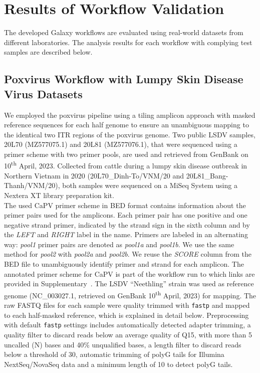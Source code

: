 \chapter{Results of Workflow Validation}\label{chap:results}
The developed Galaxy workflows are evaluated using real-world datasets from different laboratories. The analysis results for each workflow with complying test samples are described below.

\section{Poxvirus Workflow with Lumpy Skin Disease Virus Datasets}
We employed the poxvirus pipeline using a tiling amplicon approach with masked reference sequences for each half genome to ensure an unambiguous mapping to the identical two \ac{ITR} regions of the poxvirus genome. Two public \ac{LSDV} samples, 20L70 (MZ577075.1) and 20L81 (MZ577076.1), that were sequenced using a primer scheme with two primer pools, are used and retrieved from GenBank on 10\textsuperscript{th} April, 2023. Collected from cattle  during a lumpy skin disease outbreak in Northern Vietnam in 2020 (20L70\_Dinh-To/VNM/20 and 20L81\_Bang-Thanh/VNM/20), both samples were sequenced on a MiSeq System using a Nextera XT library preparation kit. \\
The used \acs{CaPV} primer scheme in \ac{BED} format contains information about the primer pairs used for the amplicons. Each primer pair has one positive and one negative strand primer, indicated by the strand sign in the sixth column and by the \textit{LEFT} and \textit{RIGHT} label in the name. Primers are labeled in an alternating way: \textit{pool1} primer pairs are denoted as \textit{pool1a} and \textit{pool1b}. We use the same method for \textit{pool2} with \textit{pool2a} and \textit{pool2b}. We reuse the \textit{SCORE} column from the \ac{BED} file to unambiguously identify primer and strand for each amplicon. The annotated primer scheme for \ac{CaPV} is part of the workflow run to which links are provided in Supplementary~. The \ac{LSDV} ``Neethling'' strain was used as reference genome (NC\_003027.1, retrieved on GenBank 10\textsuperscript{th} April, 2023) for mapping. The raw FASTQ files for each sample were quality trimmed with \texttt{fastp} and mapped to each half-masked reference, which is explained in detail below. Preprocessing with default \texttt{fastp} settings includes automatically detected adapter trimming, a quality filter to discard reads below an average quality of Q15, with more than 5 uncalled (N) bases and 40\% unqualified bases, a length filter to discard reads below a threshold of 30, automatic trimming of polyG tails for Illumina NextSeq/NovaSeq data and a minimum length of 10 to detect polyG tails.
\\


